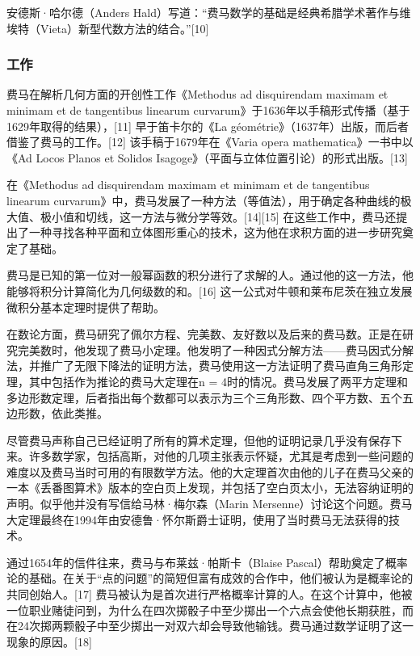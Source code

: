 安德斯·哈尔德（Anders Hald）写道：“费马数学的基础是经典希腊学术著作与维埃特（Vieta）新型代数方法的结合。”[10]
\subsubsection{工作}
费马在解析几何方面的开创性工作《Methodus ad disquirendam maximam et minimam et de tangentibus linearum curvarum》于1636年以手稿形式传播（基于1629年取得的结果），[11] 早于笛卡尔的《La géométrie》（1637年）出版，而后者借鉴了费马的工作。[12] 该手稿于1679年在《Varia opera mathematica》一书中以《Ad Locos Planos et Solidos Isagoge》（平面与立体位置引论）的形式出版。[13]

在《Methodus ad disquirendam maximam et minimam et de tangentibus linearum curvarum》中，费马发展了一种方法（等值法），用于确定各种曲线的极大值、极小值和切线，这一方法与微分学等效。[14][15] 在这些工作中，费马还提出了一种寻找各种平面和立体图形重心的技术，这为他在求积方面的进一步研究奠定了基础。

费马是已知的第一位对一般幂函数的积分进行了求解的人。通过他的这一方法，他能够将积分计算简化为几何级数的和。[16] 这一公式对牛顿和莱布尼茨在独立发展微积分基本定理时提供了帮助。

在数论方面，费马研究了佩尔方程、完美数、友好数以及后来的费马数。正是在研究完美数时，他发现了费马小定理。他发明了一种因式分解方法——费马因式分解法，并推广了无限下降法的证明方法，费马使用这一方法证明了费马直角三角形定理，其中包括作为推论的费马大定理在n = 4时的情况。费马发展了两平方定理和多边形数定理，后者指出每个数都可以表示为三个三角形数、四个平方数、五个五边形数，依此类推。

尽管费马声称自己已经证明了所有的算术定理，但他的证明记录几乎没有保存下来。许多数学家，包括高斯，对他的几项主张表示怀疑，尤其是考虑到一些问题的难度以及费马当时可用的有限数学方法。他的大定理首次由他的儿子在费马父亲的一本《丢番图算术》版本的空白页上发现，并包括了空白页太小，无法容纳证明的声明。似乎他并没有写信给马林·梅尔森（Marin Mersenne）讨论这个问题。费马大定理最终在1994年由安德鲁·怀尔斯爵士证明，使用了当时费马无法获得的技术。

通过1654年的信件往来，费马与布莱兹·帕斯卡（Blaise Pascal）帮助奠定了概率论的基础。在关于“点的问题”的简短但富有成效的合作中，他们被认为是概率论的共同创始人。[17] 费马被认为是首次进行严格概率计算的人。在这个计算中，他被一位职业赌徒问到，为什么在四次掷骰子中至少掷出一个六点会使他长期获胜，而在24次掷两颗骰子中至少掷出一对双六却会导致他输钱。费马通过数学证明了这一现象的原因。[18]